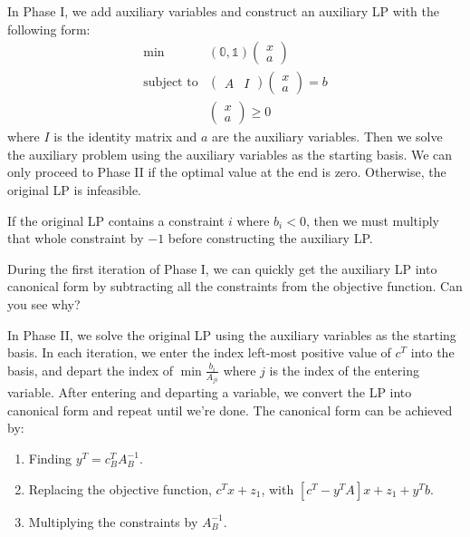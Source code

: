 \documentclass[a4paper]{report}
\newcommand{\m}[1]{\begin{pmatrix}
	#1
\end{pmatrix}}
\begin{document}
	\begin{definition}
		\label{phase:i} In Phase I, we add auxiliary variables and construct an
		auxiliary LP with the following form:
		\begin{equation*}
			\begin{aligned}
				\min              & (\mathbb{0}, \mathbb{1}) \m{x \\ a} \\
				\text{subject to} & \m{A & I} \m{x \\ a} = b            \\
				                  & \m{x \\ a} \geq 0
			\end{aligned}
		\end{equation*}
		where $I$ is the identity matrix and $a$ are the auxiliary variables. Then
		we solve the auxiliary problem using the auxiliary variables as the starting
		basis. We can only proceed to Phase II if the optimal value at the end is zero.
		Otherwise, the original LP is infeasible.
		\begin{note}
			If the original LP contains a constraint $i$ where $b_{i} < 0$, then we
			must multiply that whole constraint by $-1$ before constructing the
			auxiliary LP.
		\end{note}
		\begin{tip}
			During the first iteration of Phase I, we can quickly get the auxiliary LP
			into canonical form by subtracting all the constraints from the objective
			function. Can you see why?
		\end{tip}
	\end{definition}

	\begin{definition}
		In Phase II, we solve the original LP using the auxiliary variables as the
		starting basis. In each iteration, we enter the index left-most positive
		value of $c^{T}$ into the basis, and depart the index of $\min \frac{b_{i}}{A_{ji}}$
		where $j$ is the index of the entering variable. After entering and
		departing a variable, we convert the LP into canonical form and repeat until
		we're done. The canonical form can be achieved by:
		\begin{enumerate}
			\item Finding $y^{T} = c_{B}^{T} A_{B}^{-1}$.

			\item Replacing the objective function, $c^{T} x + z_{1}$, with $[c^{T} - y
				^{T} A]x + z_{1} + y^{T} b$.

			\item Multiplying the constraints by $A_{B}^{-1}$.
		\end{enumerate}
	\end{definition}
\end{document}
